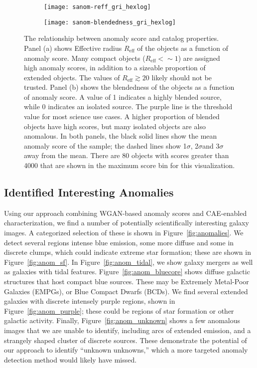 \documentclass[fleqn,usenatbib,useAMS]{mnras}
\newcommand{\sig}{$\sigma$} %
\begin{document}
\begin{figure*}
    \begin{subfigure}{.49\textwidth}
      \centering
      \texttt{[image: sanom-reff\_gri\_hexlog]}  
      \caption{}
      \label{fig:reff}
    \end{subfigure}
    \begin{subfigure}{.49\textwidth}
      \centering
      \texttt{[image: sanom-blendedness\_gri\_hexlog]}
      \caption{}
      \label{fig:blend}
    \end{subfigure}
    \vspace{0cm}
    \caption{The relationship between anomaly score and catalog properties. Panel (a) shows Effective radius $R_\mathrm{eff}$ of the objects as a function of anomaly score. Many compact objects ($R_\mathrm{eff}<\sim1$) are assigned high anomaly scores, in addition to a sizeable proportion of extended objects. The values of $R_\mathrm{eff} \gtrsim 20$ likely should not be trusted. Panel (b) shows the blendedness of the objects as a function of anomaly score. A value of 1 indicates a highly blended source, while 0 indicates an isolated source. The purple line is the threshold value for most science use cases. A higher proportion of blended objects have high scores, but many isolated objects are also anomalous. In both panels, the black solid lines show the mean anomaly score of the sample; the dashed lines show 1\sig, 2\sig and 3\sig away from the mean. There are 80 objects with scores greater than 4000 that are shown in the maximum score bin for this visualization.}
    \label{fig:reff-blend}
\end{figure*}


\subsection{Identified Interesting Anomalies}
\label{sec:interesting}

Using our approach combining WGAN-based anomaly scores and CAE-enabled characterization, we find a number of potentially scientifically interesting galaxy images.
A categorized selection of these is shown in Figure~\ref{fig:anomalies}.
We detect several regions intense blue emission, some more diffuse and some in discrete clumps, which could indicate extreme star formation; these are shown in Figure~\ref{fig:anom_sf}.
In Figure~\ref{fig:anom_tidal}, we show galaxy mergers as well as galaxies with tidal features. 
Figure~\ref{fig:anom_bluecore} shows diffuse galactic structures that host compact blue sources.
These may be Extremely Metal-Poor Galaxies (EMPGs), or Blue Compact Dwarfs (BCDs).
We find several extended galaxies with discrete intensely purple regions, shown in Figure~\ref{fig:anom_purple}; these could be regions of star formation or other galactic activity.
Finally, Figure~\ref{fig:anom_unknown} shows a few anomalous images that we are unable to identify, including arcs of extended emission, and a strangely shaped cluster of discrete sources.
These demonstrate the potential of our approach to identify ``unknown unknowns,'' which a more targeted anomaly detection method would likely have missed.
\end{document}
